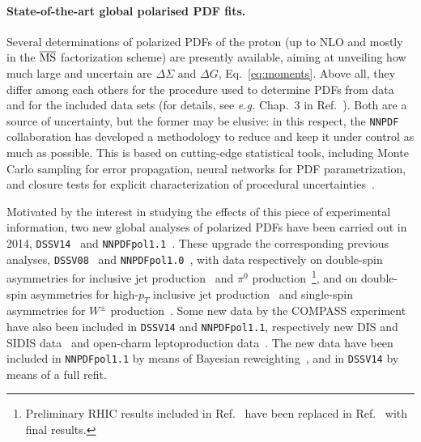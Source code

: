 
\paragraph{State-of-the-art global polarised PDF fits.}

Several determinations of polarized PDFs of the proton (up to NLO and mostly 
in the $\overline{\rm MS}$ factorization scheme) are presently available, 
aiming at unveiling how much large and uncertain are $\Delta\Sigma$ and 
$\Delta G$, Eq.~\eqref{eq:moments}. Above all, they differ among each others 
for the procedure used to determine PDFs from data and for the included data 
sets (for details, see {\it e.g.} Chap.~3 in 
Ref.~\cite{Nocera:2014vla}). Both are a source of uncertainty, but the 
former may be elusive: in this respect, the {\tt NNPDF} collaboration has 
developed a methodology to reduce and keep it under control as much as possible.
This is based on cutting-edge statistical tools, including Monte Carlo sampling
for error propagation, neural networks for PDF parametrization, and closure 
tests for explicit characterization of procedural 
uncertainties~\cite{Ball:2014uwa}.

Motivated by the interest in studying the effects of this piece of experimental
information, two new global analyses of polarized PDFs have been carried out in
2014, {\tt DSSV14}~\cite{deFlorian:2014yva} and 
{\tt NNPDFpol1.1}~\cite{Nocera:2014gqa}. 
These upgrade the corresponding previous analyses, 
{\tt DSSV08}~\cite{deFlorian:2008mr} and 
{\tt NNPDFpol1.0}~\cite{Ball:2013lla}, with data respectively on double-spin 
asymmetries for inclusive jet production~\cite{Adamczyk:2014ozi} 
and $\pi^0$ production~\cite{Adare:2014hsq}\footnote{Preliminary RHIC results 
included in Ref.~\cite{deFlorian:2008mr} have been replaced in
Ref.~\cite{deFlorian:2014yva} with final results.}, 
and on double-spin asymmetries for high-$p_T$ inclusive jet 
production~\cite{Adamczyk:2014ozi,Adamczyk:2012qj,Adare:2010cc} and single-spin
asymmetries for $W^\pm$ production~\cite{Adamczyk:2014xyw}.
Some new data by the COMPASS experiment have also been included in 
{\tt DSSV14} and {\tt NNPDFpol1.1}, respectively new DIS and SIDIS 
data~\cite{Alekseev:2010hc,Alekseev:2010ub} and open-charm leptoproduction 
data~\cite{Adolph:2012ca}. The new data have been included in {\tt NNPDFpol1.1}
by means of Bayesian reweighting~\cite{Ball:2010gb},
and in {\tt DSSV14} by means of a full refit.  

